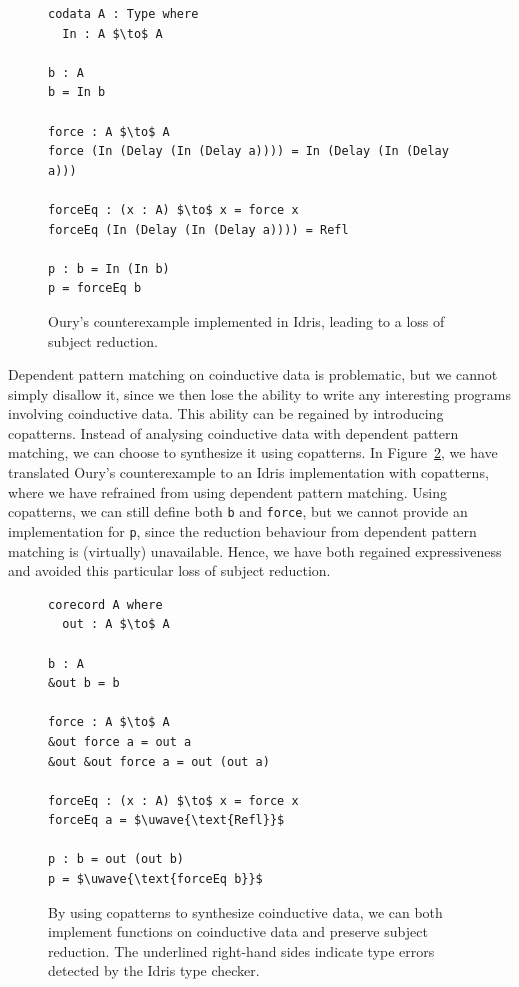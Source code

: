 \begin{figure}
\begin{lstlisting}[mathescape]
codata A : Type where
  In : A $\to$ A

b : A
b = In b

force : A $\to$ A
force (In (Delay (In (Delay a)))) = In (Delay (In (Delay a)))

forceEq : (x : A) $\to$ x = force x
forceEq (In (Delay (In (Delay a)))) = Refl

p : b = In (In b)
p = forceEq b
\end{lstlisting}
  \caption{Oury's counterexample implemented in Idris, leading to a loss of
    subject reduction.}
\label{fig:ourys_counterexample_idris}
\end{figure}

Dependent pattern matching on coinductive data is problematic, but we cannot
simply disallow it, since we then lose the ability to write any interesting
programs involving coinductive data. This ability can be regained by introducing
copatterns. Instead of analysing coinductive data with dependent pattern
matching, we can choose to synthesize it using copatterns. In
Figure~\ref{fig:ourys_counterexample_copatterns}, we have translated Oury's
counterexample to an Idris implementation with copatterns, where we have
refrained from using dependent pattern matching. Using copatterns, we can still
define both \texttt{b} and \texttt{force}, but we cannot provide an
implementation for \texttt{p}, since the reduction behaviour from dependent
pattern matching is (virtually) unavailable. Hence, we have both regained
expressiveness and avoided this particular loss of subject reduction.

\begin{figure}[h]
\begin{lstlisting}[mathescape]
corecord A where
  out : A $\to$ A

b : A
&out b = b

force : A $\to$ A
&out force a = out a
&out &out force a = out (out a)

forceEq : (x : A) $\to$ x = force x
forceEq a = $\uwave{\text{Refl}}$

p : b = out (out b)
p = $\uwave{\text{forceEq b}}$
\end{lstlisting}
  \caption{By using copatterns to synthesize coinductive data, we can both
    implement functions on coinductive data and preserve subject
    reduction. The underlined right-hand sides indicate type errors detected by
    the Idris type checker.}
\label{fig:ourys_counterexample_copatterns}
\end{figure}

